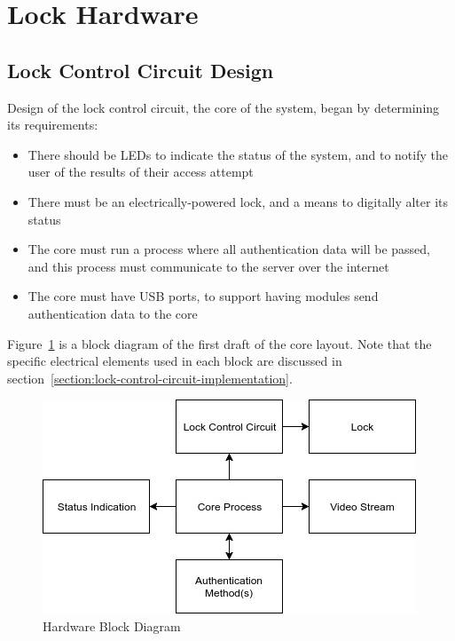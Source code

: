 \documentclass[12pt]{report}
\let\Oldsection\section
\renewcommand{\section}{\FloatBarrier\Oldsection}
\let\Oldsubsection\subsection
\renewcommand{\subsection}{\FloatBarrier\Oldsubsection}
\begin{document}

\section{Lock Hardware} \label{lock-hardware}


\subsection{Lock Control Circuit Design} \label{lock-control-circuit-design}

Design of the lock control circuit, the core of the system, began by determining its requirements:
\begin{itemize}
    \item There should be LEDs to indicate the status of the system, and to notify the user of the results of their 
    access attempt
    \item There must be an electrically-powered lock, and a means to digitally alter its status
    \item The core must run a process where all authentication data will be passed, and this process must communicate 
    to the server over the internet
    \item The core must have USB ports, to support having modules send authentication data to the core
\end{itemize}

Figure~\ref{fig:hardware-block} is a block diagram of the first draft of the core layout. Note that the specific 
electrical elements used in each block are discussed in section~\ref{section:lock-control-circuit-implementation}.

\begin{figure}
    \includegraphics[width=\textwidth]{Diagrams/hardware_block}
    \caption{Hardware Block Diagram}
    \label{fig:hardware-block}
\end{figure}
\end{document}
